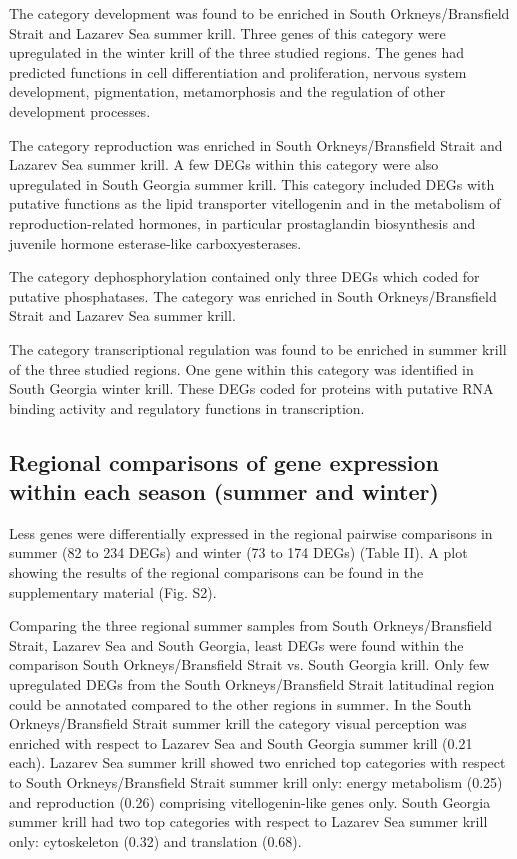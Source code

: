 The category development was found to be enriched in South Orkneys/Bransfield
Strait and Lazarev Sea summer krill. Three genes of this category were
upregulated in the winter krill of the three studied regions. The genes had
predicted functions in cell differentiation and proliferation, nervous system
development, pigmentation, metamorphosis and the regulation of other
development processes.

The category reproduction was enriched in South Orkneys/Bransfield Strait and
Lazarev Sea summer krill. A few DEGs within this category were also upregulated
in South Georgia summer krill. This category included DEGs with putative
functions as the lipid transporter vitellogenin and in the metabolism of
reproduction-related hormones, in particular prostaglandin biosynthesis and
juvenile hormone esterase-like carboxyesterases.

The category dephosphorylation contained only three DEGs which coded for
putative phosphatases. The category was enriched in South Orkneys/Bransfield
Strait and Lazarev Sea summer krill.

The category transcriptional regulation was found to be enriched in summer
krill of the three studied regions. One gene within this category was
identified in South Georgia winter krill. These DEGs coded for proteins with
putative RNA binding activity and regulatory functions in transcription.

\subsection*{Regional comparisons of gene expression within each season (summer and winter)}

Less genes were differentially expressed in the regional pairwise comparisons
in summer (82 to 234 DEGs) and winter (73 to 174 DEGs) (Table II). A plot
showing the results of the regional comparisons can be found in the
supplementary material (Fig. S2).

Comparing the three regional summer samples from South Orkneys/Bransfield
Strait, Lazarev Sea and South Georgia, least DEGs were found within the
comparison South Orkneys/Bransfield Strait vs. South Georgia krill. Only few
upregulated DEGs from the South Orkneys/Bransfield Strait latitudinal region
could be annotated compared to the other regions in summer. In the South
Orkneys/Bransfield Strait summer krill the category visual perception was
enriched with respect to Lazarev Sea and South Georgia summer krill (0.21
each). Lazarev Sea summer krill showed two enriched top categories with respect
to South Orkneys/Bransfield Strait summer krill only: energy metabolism (0.25)
and reproduction (0.26) comprising vitellogenin-like genes only. South Georgia
summer krill had two top categories with respect to Lazarev Sea summer krill
only: cytoskeleton (0.32) and translation (0.68).

